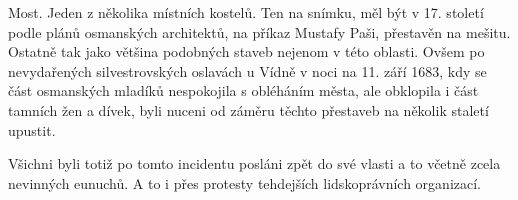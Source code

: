 
Most. Jeden z několika místních kostelů. Ten na snímku, měl být v 17.
století podle plánů osmanských architektů, na příkaz Mustafy Paši,
přestavěn na mešitu. Ostatně tak jako většina podobných staveb nejenom
v této oblasti. Ovšem po nevydařených silvestrovských oslavách u Vídně
v noci na 11. září 1683, kdy se část osmanských mladíků nespokojila s
obléháním města, ale obklopila i část tamních žen a dívek, byli nuceni
od záměru těchto přestaveb na několik staletí upustit.

Všichni byli totiž po tomto incidentu posláni zpět do své vlasti a to
včetně zcela nevinných eunuchů. A to i přes protesty tehdejších
lidskoprávních organizací.
